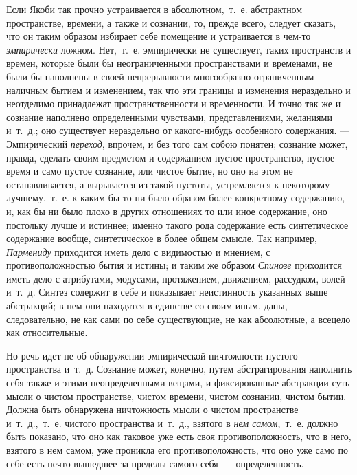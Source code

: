 Если Якоби так прочно устраивается в абсолютном,~т.~е. абстрактном
пространстве, времени, а также и сознании, то, прежде всего, следует
сказать, что он таким образом избирает себе помещение и устраивается в
чем-то {\em эмпирически} ложном. Нет,~т.~е. эмпирически
не существует, таких пространств и времен, которые были бы неограниченными
пространствами и временами, не были бы наполнены в своей непрерывности
многообразно ограниченным наличным бытием и изменением, так что эти границы
и изменения нераздельно и неотделимо принадлежат пространственности и
временности. И точно так же и сознание наполнено определенными чувствами,
представлениями, желаниями и~т.~д.; оно существует нераздельно от
какого-нибудь особенного содержания. --- Эмпирический
{\em переход}, впрочем, и без того сам собою понятен;
сознание может, правда, сделать своим предметом и содержанием пустое
пространство, пустое время и само пустое сознание, или чистое бытие, но оно
на этом не останавливается, а вырывается из такой пустоты, устремляется к
некоторому лучшему,~т.~е. к каким бы то ни было образом более конкретному
содержанию, и, как бы ни было плохо в других отношениях то или иное
содержание, оно постольку лучше и истиннее; именно такого рода содержание
есть синтетическое содержание вообще, синтетическое в более общем смысле.
Так например, {\em Пармениду} приходится иметь дело с
видимостью и мнением, с противоположностью бытия и истины; и таким же
образом {\em Спинозе} приходится иметь дело с
атрибутами, модусами, протяжением, движением, рассудком, волей и~т.~д.
Синтез содержит в себе и показывает неистинность указанных выше абстракций;
в нем они находятся в единстве со своим иным, даны, следовательно, не как
сами по себе существующие, не как абсолютные, а всецело как относительные.

Но речь идет не об обнаружении эмпирической ничтожности пустого пространства
и~т.~д. Сознание может, конечно, путем абстрагирования наполнить себя также
и этими неопределенными вещами, и фиксированные абстракции суть мысли о
чистом пространстве, чистом времени, чистом сознании, чистом бытии. Должна
быть обнаружена ничтожность мысли о чистом пространстве и~т.~д.,~т.~е.
чистого пространства и~т.~д., взятого в {\em нем
самом},~т.~е. должно быть показано, что оно как таковое уже есть своя
противоположность, что в него, взятого в нем самом, уже проникла его
противоположность, что оно уже само по себе есть нечто вышедшее за пределы
самого себя ---~определенность.

